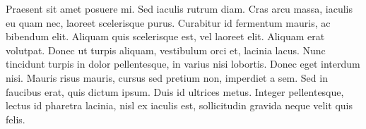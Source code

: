 \documentclass{article}
\begin{document}
Praesent sit amet posuere mi. Sed iaculis rutrum diam. Cras arcu massa, iaculis eu quam nec, laoreet scelerisque purus. Curabitur id fermentum mauris, ac bibendum elit. Aliquam quis scelerisque est, vel laoreet elit. Aliquam erat volutpat. Donec ut turpis aliquam, vestibulum orci et, lacinia lacus. Nunc tincidunt turpis in dolor pellentesque, in varius nisi lobortis. Donec eget interdum nisi. Mauris risus mauris, cursus sed pretium non, imperdiet a sem. Sed in faucibus erat, quis dictum ipsum. Duis id ultrices metus. Integer pellentesque, lectus id pharetra lacinia, nisl ex iaculis est, sollicitudin gravida neque velit quis felis.
\end{document}
